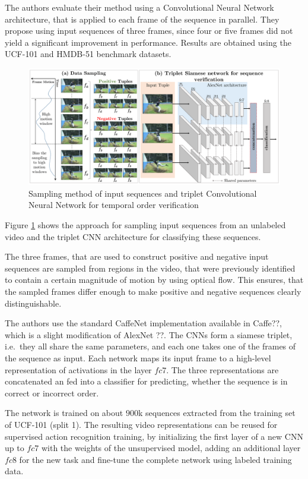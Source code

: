 The authors evaluate their method using a Convolutional Neural Network architecture, that is applied to each frame of the sequence in parallel.
They propose using input sequences of three frames, since four or five frames did not yield a significant improvement in performance.
Results are obtained using the UCF-101 and HMDB-51 benchmark datasets.

\begin{figure}[H]
    \centering
    \includegraphics[width=\textwidth]{img_deep/shufflelearn_approach}
    \caption{Sampling method of input sequences and triplet Convolutional Neural Network for temporal order verification \cite{misra_shuffle_2016}}
    \label{fig:shufflelearn_approach}
\end{figure}

Figure \ref{fig:shufflelearn_approach} shows the approach for sampling input sequences from an unlabeled video and the triplet CNN architecture for classifying these sequences.

The three frames, that are used to construct positive and negative input sequences are sampled from regions in the video, that were previously identified to contain a certain magnitude of motion by using optical flow.
This ensures, that the sampled frames differ enough to make positive and negative sequences clearly distinguishable.

The authors use the standard CaffeNet implementation available in Caffe??, which is a slight modification of AlexNet ??.
The CNNs form a siamese triplet, i.e.\ they all share the same parameters, and each one takes one of the frames of the sequence as input.
Each network maps its input frame to a high-level representation of activations in the layer $fc7$.
The three representations are concatenated an fed into a classifier for predicting, whether the sequence is in correct or incorrect order.

The network is trained on about $900$k sequences extracted from the training set of UCF-101 (split 1).
The resulting video representations can be reused for supervised action recognition training, by initializing the first layer of a new CNN up to $fc7$ with the weights of the unsupervised model, adding an additional layer $fc8$ for the new task and fine-tune the complete network using labeled training data.

